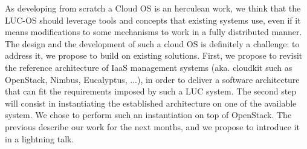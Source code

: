 As developing from scratch a Cloud OS is an herculean work, we think that the 
LUC-OS should leverage tools and concepts that existing systems use, even if 
it means modifications to some mechanisms to work in a fully distributed manner.
The design and the development of such a cloud OS is definitely a challenge: to 
address it, we propose to build on existing solutions. First, we propose 
to revisit the reference architecture of IaaS management systems (aka. cloudkit 
such as OpenStack, Nimbus, Eucalyptus, ...), in order to deliver a software 
architecture that can fit the requirements imposed by such a LUC system. The 
second step will consist in instantiating the established architecture on one of
the available system. We chose to perform such an instantiation on top of 
OpenStack. The previous describe our work for the next months, and we propose
to introduce it in a lightning talk.